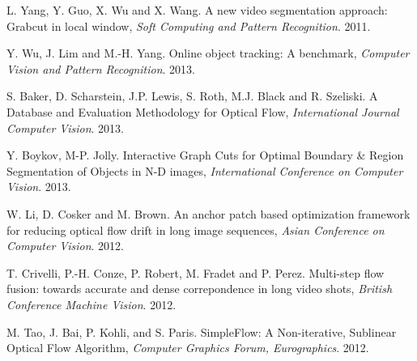 \begin{thebibliography}{99}
L. Yang, Y. Guo, X. Wu and X. Wang. A new video segmentation approach: Grabcut in local window,  {\it Soft Computing and Pattern Recognition}. 2011.

Y. Wu, J. Lim and M.-H. Yang. Online object tracking: A benchmark, {\it Computer Vision and Pattern Recognition}. 2013.

S. Baker, D. Scharstein, J.P. Lewis, S. Roth, M.J. Black and R. Szeliski. A Database and Evaluation Methodology for Optical Flow, {\it International Journal Computer Vision}. 2013.

Y. Boykov, M-P. Jolly. Interactive Graph Cuts for Optimal Boundary \& Region Segmentation of Objects in N-D images, {\it International Conference on Computer Vision}. 2013.

W. Li, D. Cosker and M. Brown. An anchor patch based optimization framework for reducing optical flow drift in long image sequences, {\it Asian Conference on Computer Vision}. 2012.

T. Crivelli, P.-H. Conze, P. Robert, M. Fradet and P. Perez. Multi-step flow fusion: towards accurate and dense correpondence in long video shots, {\it British Conference Machine Vision}. 2012.

M. Tao, J. Bai, P. Kohli, and S. Paris. SimpleFlow: A Non-iterative, Sublinear Optical Flow Algorithm, {\it Computer Graphics Forum, Eurographics}. 2012.
\end{thebibliography}
